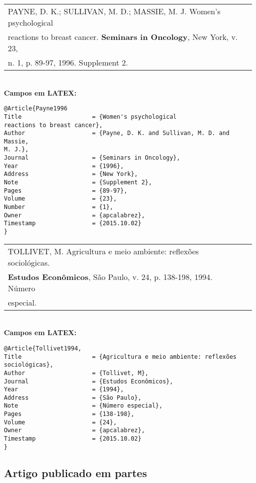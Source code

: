 \begin{tabular}{|l|c|} \hline
	PAYNE, D. K.; SULLIVAN, M. D.; MASSIE, M. J. Women's psychological \\ reactions to breast cancer. \textbf{Seminars in Oncology},  New York, v. 23, \\n. 1, p. 89-97, 1996. Supplement 2.
	\\\hline
\end{tabular} \\

\textbf{Campos em LATEX:} 

\begin{verbatim}
@Article{Payne1996
Title                    = {Women's psychological
reactions to breast cancer},
Author                   = {Payne, D. K. and Sullivan, M. D. and Massie, 
M. J.},
Journal                  = {Seminars in Oncology},
Year                     = {1996},
Address                  = {New York},
Note                     = {Supplement 2},
Pages                    = {89-97},
Volume                   = {23},
Number                   = {1},
Owner                    = {apcalabrez},
Timestamp                = {2015.10.02}
}
\end{verbatim}

\begin{tabular}{|l|c|} \hline
	TOLLIVET, M. Agricultura e meio ambiente: reflexões sociológicas. \\\textbf{Estudos Econômicos},  São Paulo, v. 24, p. 138-198, 1994. Número \\especial. 
	\\\hline
\end{tabular} \\

\textbf{Campos em LATEX:} 

\begin{verbatim}
@Article{Tollivet1994,
Title                    = {Agricultura e meio ambiente: reflexões 
sociológicas},
Author                   = {Tollivet, M},
Journal                  = {Estudos Econômicos},
Year                     = {1994},
Address                  = {São Paulo},
Note                     = {Número especial},
Pages                    = {138-198},
Volume                   = {24},
Owner                    = {apcalabrez},
Timestamp                = {2015.10.02}
}
\end{verbatim}

\subsection{Artigo publicado em partes}

